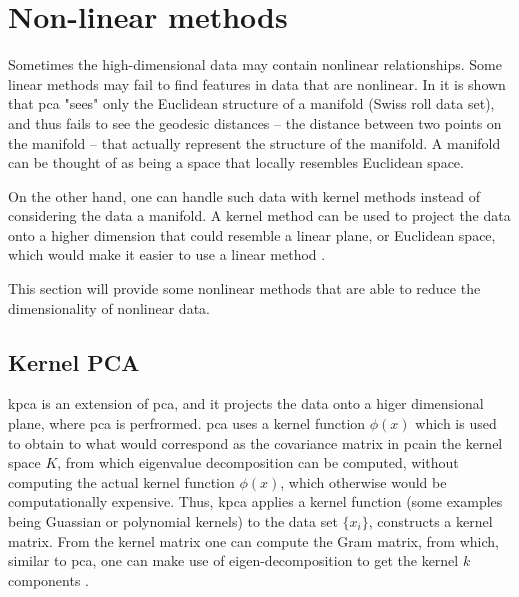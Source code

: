 \usepackage{comment}
\section{Non-linear methods}\label{sec:non-linear-methods}
Sometimes the high-dimensional data may contain nonlinear relationships. Some linear methods may fail to find features in data that are nonlinear. In \cite{Tennenbaum} it is shown that \gls{pca} "sees" only the Euclidean structure of a manifold (Swiss roll data set), and thus fails to see the geodesic distances -- the distance between two points on the manifold -- that actually represent the structure of the manifold. A manifold can be thought of as being a space that locally resembles Euclidean space.

On the other hand, one can handle such data with kernel methods instead of considering the data a manifold. A kernel method can be used to project the data onto a higher dimension that could resemble a linear plane, or Euclidean space, which would make it easier to use a linear method \cite{LVD}.

This section will provide some nonlinear methods that are able to reduce the dimensionality of nonlinear data.



\begin{comment}
    @misc{Tennenbaum,
      url        = {https://wearables.cc.gatech.edu/paper\_of\_week/isomap.pdf},
      title      =  {A Global Geometric Framework for Nonlinear Dimensionality Reduction}
      author       = {Joshua B. Tennenbaum, Vin de Silva, John C. Langford},
      urldate      = {2022-10-11}
    }
\end{comment}
\subsection{Kernel PCA}\label{subsec:kernel-pca}
\gls{kpca} is an extension of \gls{pca}, and it projects the data onto a higer dimensional plane, where \gls{pca} is perfrormed. \gls{pca} uses a kernel function $\phi (x)$ which is used to obtain to what would correspond as the covariance matrix in \gls{pca}in the kernel space $K$, from which eigenvalue decomposition can be computed, without computing the actual kernel function $\phi (x)$, which otherwise would be computationally expensive. Thus, \gls{kpca} applies a kernel function (some examples being Guassian or polynomial kernels) to the data set $ \{x_{i} \}$, constructs a kernel matrix. From the kernel matrix one can compute the Gram matrix, from which, similar to \gls{pca}, one can make use of eigen-decomposition to get the kernel $k$ components \cite{kernel-pca}.

